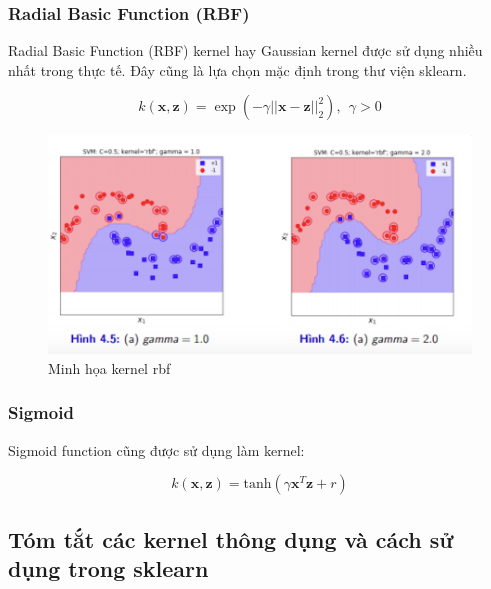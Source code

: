 \documentclass[a4paper, 12pt, oneside]{report}
\begin{document}
\subsubsection{Radial Basic Function (RBF)}
Radial Basic Function (RBF) kernel hay Gaussian kernel được sử dụng nhiều nhất trong thực tế. Đây cũng là lựa chọn mặc định trong thư viện sklearn. 
\begin{mybox}
$$ k(\mathbf{x}, \mathbf{z}) = \exp(-\gamma ||\mathbf{x} - \mathbf{z}||_2^2), ~~ \gamma > 0 $$ \end{mybox}
\begin{center}
    \begin{figure}[H]
    \begin{center}
     \includegraphics[scale=0.7]{poly.png}
    \end{center}
    \caption{Minh họa kernel rbf}
    \label{Hình 4.4}
    \end{figure}
\end{center}
\subsubsection{Sigmoid}
Sigmoid function cũng được sử dụng làm kernel:
\begin{mybox}
$$k(\mathbf{x}, \mathbf{z}) = \text{tanh}(\gamma \mathbf{x}^T\mathbf{z} + r)$$
\end{mybox}
\subsection{Tóm tắt các kernel thông dụng và cách sử dụng trong sklearn}
\end{document}

